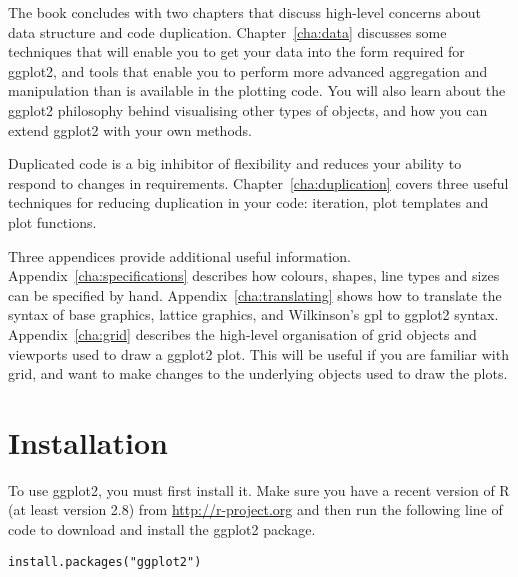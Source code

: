 The book concludes with two chapters that discuss high-level concerns about data structure and code duplication.  Chapter~\ref{cha:data} discusses some techniques that will enable you to get your data into the form required for ggplot2, and tools that enable you to perform more advanced aggregation and manipulation than is available in the plotting code. You will also learn about the ggplot2 philosophy behind visualising other types of objects, and how you can extend ggplot2 with your own methods.

Duplicated code is a big inhibitor of flexibility and reduces your ability to respond to changes in requirements. Chapter~\ref{cha:duplication} covers three useful techniques for reducing duplication in your code: iteration, plot templates and plot functions.

Three appendices provide additional useful information.  Appendix~\ref{cha:specifications} describes how colours, shapes, line types and sizes can be specified by hand.  Appendix~\ref{cha:translating} shows how to translate the syntax of base graphics, lattice graphics, and Wilkinson's {\sc gpl} to ggplot2 syntax.  Appendix~\ref{cha:grid} describes the high-level organisation of grid objects and viewports used to draw a ggplot2 plot.  This will be useful if you are familiar with grid, and want to make changes to the underlying objects used to draw the plots.

\section{Installation}\label{sub:installation}

To use ggplot2, you must first install it. Make sure you have a recent version of R (at least version 2.8) from \url{http://r-project.org} and then run the following line of code to download and install the ggplot2 package.  

\begin{verbatim}
install.packages("ggplot2")
\end{verbatim}

% 
% 
% 

